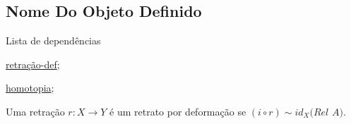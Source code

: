 \subsection{Nome Do Objeto Definido}
\label{retrato-por-deformação-def}
\begin{titlemize}{Lista de dependências}
	\item \hyperref[retração-def]{retração-def};\\ %
	\item \hyperref[homotopia]{homotopia};\\
\end{titlemize}
\begin{defi}
	Uma retração $r:X \rightarrow Y$ é um retrato por deformação se $(i\circ r) \sim id_X \textit{(Rel A)}$.
\end{defi}
